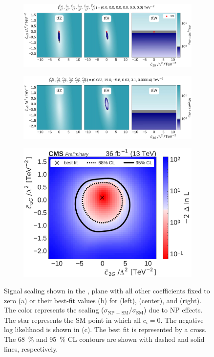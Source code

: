 \begin{figure}
  \vspace{-1cm}
  \begin{subfigure}{\linewidth}
    \centering
    \includegraphics[width=\linewidth]{figures/thirteen-TeV/scaling-frozen/c2G_cuG}
    \caption{}
  \end{subfigure}
  \begin{subfigure}{\linewidth}
    \centering
    \includegraphics[width=\linewidth]{figures/thirteen-TeV/scaling/c2G_cuG}
    \caption{}
  \end{subfigure}
  \begin{subfigure}{\linewidth}
    \centering
    \includegraphics[width=0.6\linewidth]{figures/thirteen-TeV/nll/c2G_cuG}
    \caption{}
  \end{subfigure}
  \vspace{-1cm}
  \setlength{\capwidth}{15cm}
  \setlength{\capwidth}{15cm}
  \caption[Signal scaling and profile likelihood scan in the \cuG, \ctwoG plane]{Signal scaling
    shown in the \cuG, \ctwoG plane with all other coefficients fixed to zero (a) or their best-fit
    values (b) for \ttZ (left), \ttH (center), and \ttW (right). The color represents the scaling
    ($\sigma_\text{NP + SM} / \sigma_\text{SM}$) due to NP effects. The star represents the SM point in
    which all $c_i=0$. The negative log likelihood is shown in (c). The best fit is represented by a
    cross. The \SI{68}{\percent} and \SI{95}{\percent} CL contours are shown with dashed and solid
  lines, respectively.}
\end{figure}

